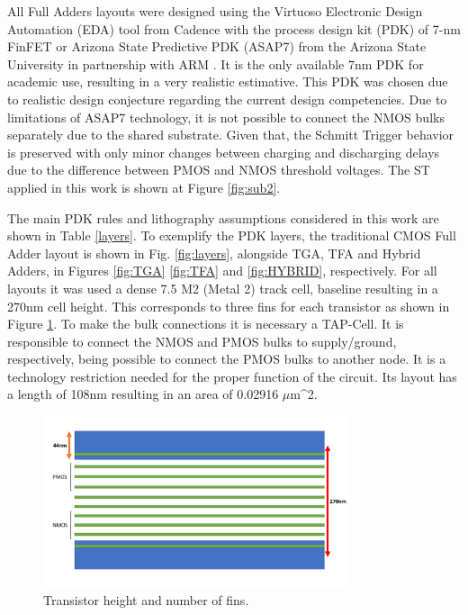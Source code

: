 \documentclass[ecp,tc, english]{iiufrgs}
\begin{document}
All Full Adders layouts were designed using the Virtuoso Electronic Design Automation (EDA) tool from Cadence\textregistered{} with the process design kit (PDK) of 7-nm FinFET or Arizona State Predictive PDK (ASAP7) from the Arizona State University in partnership with ARM \cite{clark2016asap7}. It is the only available 7nm PDK for academic use, resulting in a very realistic estimative. This PDK was chosen due to realistic design conjecture regarding the current design competencies. Due to limitations of ASAP7 technology, it is not possible to connect the NMOS bulks separately due to the shared substrate. Given that, the Schmitt Trigger behavior is preserved with only minor changes between charging and discharging delays due to the difference between PMOS and NMOS threshold voltages. The ST applied in this work is shown at Figure \ref{fig:sub2}.

The main PDK rules and lithography assumptions considered in this work are shown in Table \ref{layers}. To exemplify the PDK layers, the traditional CMOS Full Adder layout is shown in Fig. \ref{fig:layers}, alongside TGA, TFA and Hybrid Adders, in Figures \ref{fig:TGA} \ref{fig:TFA} and \ref{fig:HYBRID}, respectively. For all layouts it was used a dense 7.5 M2 (Metal 2) track cell, baseline resulting in a 270nm cell height. This corresponds to three fins for each transistor as shown in Figure \ref{th}. To make the bulk connections it is necessary a TAP-Cell. It is responsible to connect the NMOS and PMOS bulks to supply/ground, respectively, being possible to connect the PMOS bulks to another node. It is a technology restriction needed for the proper function of the circuit. Its layout has a length of 108nm resulting in an area of 0.02916 \(\mu\)m^{2}.

\begin{figure}[H]
\centering
\includegraphics[width=0.8\textwidth]{transistorHeight.pdf}
\caption{Transistor height and number of fins.}
\label{th}
\end{figure}
\end{document}
